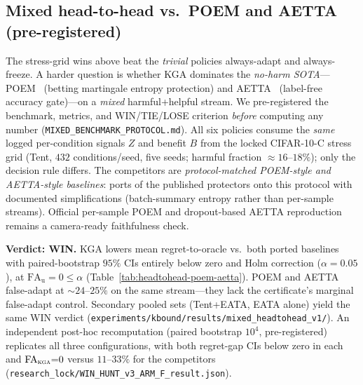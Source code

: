 \documentclass[conference]{IEEEtran}
\theoremstyle{plain}
\theoremstyle{definition}
\theoremstyle{remark}
\begin{document}
\subsection{Mixed head-to-head vs.\ POEM and AETTA (pre-registered)}
The stress-grid wins above beat the \emph{trivial} policies always-adapt and always-freeze. A harder
question is whether \textsc{KGA} dominates the \emph{no-harm SOTA}---POEM~\cite{bar2024poem} (betting
martingale entropy protection) and AETTA~\cite{lee2024aetta} (label-free accuracy gate)---on a
\emph{mixed} harmful+helpful stream. We pre-registered the benchmark, metrics, and WIN/TIE/LOSE
criterion \emph{before} computing any number (\texttt{MIXED\_BENCHMARK\_PROTOCOL.md}).
All six policies consume the \emph{same} logged per-condition signals $Z$ and benefit $B$ from the
locked CIFAR-10-C stress grid (Tent, $432$ conditions/seed, five seeds; harmful fraction
${\approx}16$--$18\%$); only the decision rule differs. The competitors are
\emph{protocol-matched POEM-style and AETTA-style baselines}: ports of the published protectors
onto this protocol with documented simplifications (batch-summary entropy rather than per-sample
streams). Official per-sample POEM and dropout-based AETTA reproduction remains a camera-ready
faithfulness check.

\textbf{Verdict: WIN.} \textsc{KGA} lowers mean regret-to-oracle vs.\ both ported baselines with
paired-bootstrap $95\%$ CIs entirely below zero and Holm correction ($\alpha{=}0.05$), at
$\mathrm{FA}_{\mathrm u}{=}0\le\alpha$ (Table~\ref{tab:headtohead-poem-aetta}). POEM and AETTA
false-adapt at ${\sim}24$--$25\%$ on the same stream---they lack the certificate's marginal
false-adapt control. Secondary pooled sets (Tent+EATA, EATA alone) yield the same WIN verdict
(\texttt{experiments/kbound/results/mixed\_headtohead\_v1/}). An independent post-hoc recomputation
(paired bootstrap $10^4$, pre-registered) replicates all three configurations, with both regret-gap
CIs below zero in each and $\mathrm{FA}_{\textsc{kga}}{=}0$ versus $11$--$33\%$ for the competitors
(\texttt{research\_lock/WIN\_HUNT\_v3\_ARM\_F\_result.json}).
\end{document}
